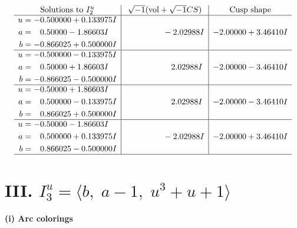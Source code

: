\documentclass[1p]{elsarticle_modified}
\theoremstyle{definition}
\newcommand{\I}{\sqrt{-1}}
\begin{document}
$$\begin{array}{c|c|c}  
\text{Solutions to }I^u_{2}& \I (\text{vol} + \sqrt{-1}CS) & \text{Cusp shape}\\
 \hline 
\begin{aligned}
u &= -0.500000 + 0.133975 I \\
a &= \phantom{-}0.50000 - 1.86603 I \\
b &= -0.866025 + 0.500000 I\end{aligned}
 & \phantom{-0.000000 } -2.02988 I & -2.00000 + 3.46410 I \\ \hline\begin{aligned}
u &= -0.500000 - 0.133975 I \\
a &= \phantom{-}0.50000 + 1.86603 I \\
b &= -0.866025 - 0.500000 I\end{aligned}
 & \phantom{-0.000000 -}2.02988 I & -2.00000 - 3.46410 I \\ \hline\begin{aligned}
u &= -0.50000 + 1.86603 I \\
a &= \phantom{-}0.500000 - 0.133975 I \\
b &= \phantom{-}0.866025 + 0.500000 I\end{aligned}
 & \phantom{-0.000000 -}2.02988 I & -2.00000 - 3.46410 I \\ \hline\begin{aligned}
u &= -0.50000 - 1.86603 I \\
a &= \phantom{-}0.500000 + 0.133975 I \\
b &= \phantom{-}0.866025 - 0.500000 I\end{aligned}
 & \phantom{-0.000000 } -2.02988 I & -2.00000 + 3.46410 I\\
 \hline 
 \end{array}$$\newpage\newpage\renewcommand{\arraystretch}{1}
\centering \section*{III. $I^u_{3}= \langle b,\;a-1,\;u^3+u+1 \rangle$}
\flushleft \textbf{(i) Arc colorings}\\
\end{document}
